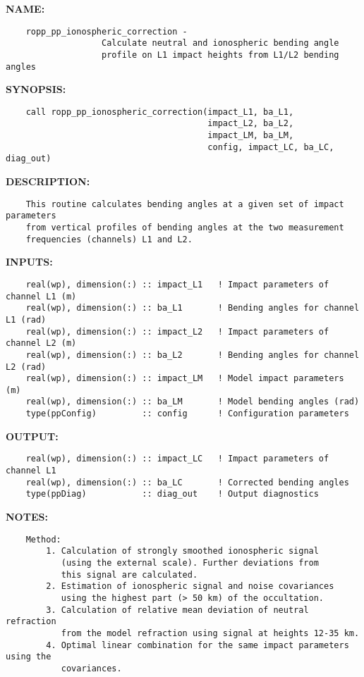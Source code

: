 \label{ch:robo28}
\label{ch:IonosphericCorrection_ropp_pp_ionospheric_correction}
\textbf{NAME:}\hspace{0.08in}\begin{Verbatim}
    ropp_pp_ionospheric_correction - 
                   Calculate neutral and ionospheric bending angle 
                   profile on L1 impact heights from L1/L2 bending angles 
\end{Verbatim}
\textbf{SYNOPSIS:}\hspace{0.08in}\begin{Verbatim}
    call ropp_pp_ionospheric_correction(impact_L1, ba_L1, 
                                        impact_L2, ba_L2,
                                        impact_LM, ba_LM,
                                        config, impact_LC, ba_LC, diag_out)
\end{Verbatim}
\textbf{DESCRIPTION:}\hspace{0.08in}\begin{Verbatim}
    This routine calculates bending angles at a given set of impact parameters
    from vertical profiles of bending angles at the two measurement 
    frequencies (channels) L1 and L2.
\end{Verbatim}
\textbf{INPUTS:}\hspace{0.08in}\begin{Verbatim}
    real(wp), dimension(:) :: impact_L1   ! Impact parameters of channel L1 (m)
    real(wp), dimension(:) :: ba_L1       ! Bending angles for channel L1 (rad)
    real(wp), dimension(:) :: impact_L2   ! Impact parameters of channel L2 (m)
    real(wp), dimension(:) :: ba_L2       ! Bending angles for channel L2 (rad)
    real(wp), dimension(:) :: impact_LM   ! Model impact parameters (m)
    real(wp), dimension(:) :: ba_LM       ! Model bending angles (rad)
    type(ppConfig)         :: config      ! Configuration parameters
\end{Verbatim}
\textbf{OUTPUT:}\hspace{0.08in}\begin{Verbatim}
    real(wp), dimension(:) :: impact_LC   ! Impact parameters of channel L1
    real(wp), dimension(:) :: ba_LC       ! Corrected bending angles 
    type(ppDiag)           :: diag_out    ! Output diagnostics
\end{Verbatim}
\textbf{NOTES:}\hspace{0.08in}\begin{Verbatim}
    Method:
        1. Calculation of strongly smoothed ionospheric signal
           (using the external scale). Further deviations from
           this signal are calculated.
        2. Estimation of ionospheric signal and noise covariances
           using the highest part (> 50 km) of the occultation.
        3. Calculation of relative mean deviation of neutral refraction
           from the model refraction using signal at heights 12-35 km.
        4. Optimal linear combination for the same impact parameters using the
           covariances.
\end{Verbatim}
